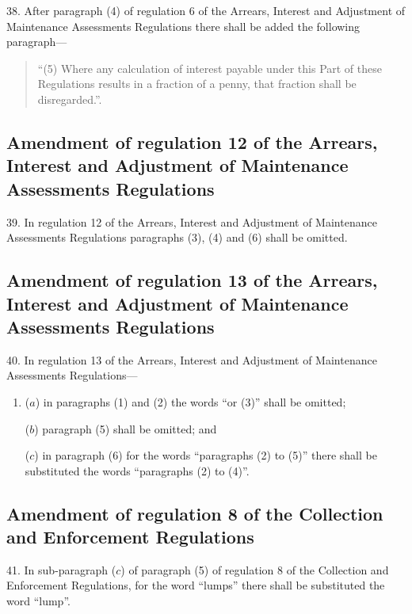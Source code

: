 \documentclass[a4paper]{article}
\begin{document}
38.  After paragraph (4) of regulation 6 of the Arrears, Interest and Adjustment of Maintenance Assessments Regulations there shall be added the following paragraph---
\begin{quotation}
“(5) Where any calculation of interest payable under this Part of these Regulations results in a fraction of a penny, that fraction shall be disregarded.”.
\end{quotation}

\subsection[39. Amendment of regulation 12 of the Arrears, Interest and Adjustment of Maintenance Assessments Regulations]{Amendment of regulation 12 of the Arrears, Interest and Adjustment of Maintenance Assessments Regulations}

39.  In regulation 12 of the Arrears, Interest and Adjustment of Maintenance Assessments Regulations paragraphs (3), (4) and (6) shall be omitted.

\subsection[40. Amendment of regulation 13 of the Arrears, Interest and Adjustment of Maintenance Assessments Regulations]{Amendment of regulation 13 of the Arrears, Interest and Adjustment of Maintenance Assessments Regulations}

40.  In regulation 13 of the Arrears, Interest and Adjustment of Maintenance Assessments Regulations---
\begin{enumerate}\item[]
($a$) in paragraphs (1) and (2) the words “or (3)” shall be omitted;

($b$) paragraph (5) shall be omitted; and

($c$) in paragraph (6) for the words “paragraphs (2) to (5)” there shall be substituted the words “paragraphs (2) to (4)”.
\end{enumerate}

\subsection[41. Amendment of regulation 8 of the Collection and Enforcement Regulations]{Amendment of regulation 8 of the Collection and Enforcement Regulations}

41.  In sub-paragraph ($c$) of paragraph (5) of regulation 8 of the Collection and Enforcement Regulations, for the word “lumps” there shall be substituted the word “lump”.
\end{document}
